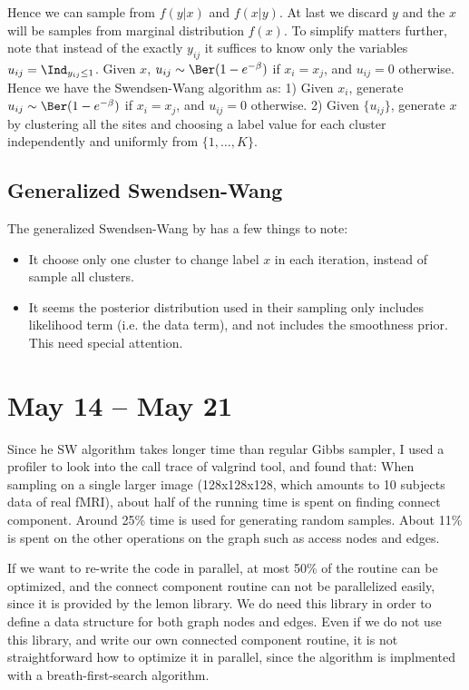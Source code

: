 \documentclass[12pt]{article}
\begin{document}
Hence we can sample from $f(y|x)$ and $f(x|y)$. At last we discard $y$ and the $x$ will be samples from marginal distribution $f(x)$. To simplify matters further, note that instead of the exactly $y_{ij}$ it suffices to know only the variables $u_{ij} = \Ind_{y_{ij} \leq 1}$. Given $x$, $u_{ij}\sim \Ber(1 - e^{-\beta})$ if $x_i = x_j$, and $u_{ij} = 0$ otherwise. Hence we have the Swendsen-Wang algorithm as: 1) Given $x_i$, generate $u_{ij} \sim \Ber(1 - e^{-\beta})$ if $x_i = x_j$, and $u_{ij} = 0$ otherwise. 2) Given $\{u_{ij}\}$, generate $x$ by clustering all the sites and choosing a label value for each cluster independently and uniformly from $\{1,\dots, K\}$.


\subsection{Generalized Swendsen-Wang}
The generalized Swendsen-Wang by \cite{barbu2005generalizing} has a few things to note:
\begin{itemize}
\item It choose only one cluster to change label $x$ in each iteration, instead of sample all clusters.
\item It seems the posterior distribution used in their sampling only includes likelihood term (i.e. the data term), and not includes the smoothness prior. This need special attention. 
\end{itemize}

\section{May 14 -- May 21}
Since he SW algorithm takes longer time than regular Gibbs sampler, I used a profiler to look into the call trace of valgrind tool, and found that: When sampling on a single larger image (128x128x128, which amounts to 10 subjects data of real fMRI), about half of the running time is spent on finding connect component. Around 25\% time is used for generating random samples. About 11\% is spent on the other operations on the graph such as access nodes and edges. 

If we want to re-write the code in parallel, at most 50\% of the routine can be optimized, and the connect component routine can not be parallelized easily, since it is provided by the \textsf{lemon} library. We do need this library in order to define a data structure for both graph nodes and edges. Even if we do not use this library, and write our own connected component routine, it is not straightforward how to optimize it in parallel, since the algorithm is implmented with a breath-first-search algorithm.
\end{document}
